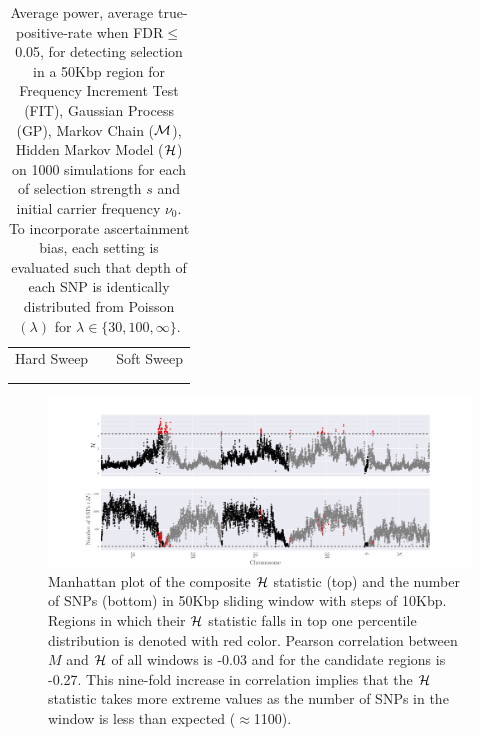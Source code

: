 \documentclass[11pt]{article}
\begin{document}
\begin{table}[h]
	\centering
	\begin{tabular}{ccc}
		Hard Sweep & &Soft Sweep\\ \\  
		
		&&
	\end{tabular}
	\caption{Average power, average true-positive-rate when FDR$\le$0.05, for 
		detecting selection in a 50Kbp region for Frequency Increment Test 
		(FIT), 
		Gaussian Process (GP), Markov Chain (${\cal M}$), Hidden Markov Model 
		(${\cal H}$) on 
		1000 
		simulations for each of selection strength $s$ and initial 
		carrier frequency $\nu_0$. To incorporate ascertainment bias, each 
		setting is evaluated such that depth of each SNP is identically 
		distributed from Poisson$(\lambda)$ for $\lambda \in 
		\{30,100,\infty\}$.}\label{tab:power}
\end{table}


\begin{figure}[H]
	\centering
	\includegraphics[width=\textwidth]{figures/manhattan.pdf}
	\caption{Manhattan plot of the composite ${\cal H}$ statistic (top) 
	and the number of SNPs (bottom) in 50Kbp sliding window with steps of 
	10Kbp. Regions in which their ${\cal H}$ statistic falls in top one percentile 
	distribution is denoted with red color. Pearson correlation between $M$ and 
	${\cal H}$ of all windows is -0.03 and for the candidate regions is -0.27. This 
	nine-fold increase in correlation implies that the ${\cal H}$ statistic takes 
	more extreme values as the number of SNPs in the window is less than 
	expected ($\approx$1100).} 
	\label{fig:manhattan}
\end{figure}




\newpage


\newpage
\end{document}
